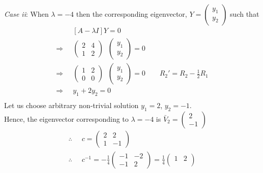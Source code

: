\documentclass[../main-sheet.tex]{subfiles}
\begin{document}
\begin{soln}
    \emph{Case ii}: When \(\lambda=-4\) then the corresponding eigenvector, \(\displaystyle Y=\begin{pmatrix}
        y_1\\
        y_2
    \end{pmatrix}\) such that
    \begin{align*}
        &[A-\lambda I]Y=0\\
        \Rightarrow\;\;&\begin{pmatrix}
            2&4\\
            1&2
        \end{pmatrix}\;\;\begin{pmatrix}
            y_1\\
            y_2
        \end{pmatrix}=0\\
        \Rightarrow\;\;&\begin{pmatrix}
            1&2\\
            0&0
        \end{pmatrix}\;\;\begin{pmatrix}
            y_1\\
            y_2
        \end{pmatrix}=0\qquad R_2'=R_2-\frac{1}{2}R_1\\
        \Rightarrow\;\;&y_1+2y_2=0\\
    \end{align*}
    Let us choose arbitrary non-trivial solution \(y_1=2\), \(y_2=-1\).\\
    Hence, the eigenvector corresponding to \(\lambda=-4\) is \(\displaystyle \bar{V}_2=\begin{pmatrix}
        2\\
        -1
    \end{pmatrix}\)\\
    \begin{align*}
        \therefore\;\;& c=\begin{pmatrix}
            2 & 2\\
            1 & -1
        \end{pmatrix}\\
        \therefore\;\;& c^{-1}=-\frac{1}{4}\begin{pmatrix}
            -1 & -2\\
            -1 & 2
        \end{pmatrix}=\frac{1}{4}\begin{pmatrix}
            1 & 2\\

\end{pmatrix}
\end{align*}
\end{soln}
\end{document}
